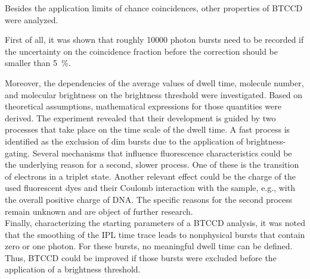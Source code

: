 Besides the application limits of chance coincidences, other properties of \gls{BTCCD} were analyzed. 

First of all, it was shown that roughly \num{10000} photon bursts need to be recorded if the uncertainty on the coincidence fraction before the correction should be smaller than \SI{5}{\percent}. 

Moreover, the dependencies of the average values of dwell time, molecule number, and molecular brightness on the brightness threshold were investigated. Based on theoretical assumptions, mathematical expressions for those quantities were derived. The experiment revealed that their development is guided by two processes that take place on the time scale of the dwell time. A fast process is identified as the exclusion of dim bursts due to the application of brightness-gating. Several mechanisms that influence fluorescence characteristics could be the underlying reason for a second, slower process. One of these is the transition of electrons in a triplet state. Another relevant effect could be the charge of the used fluorescent dyes and their Coulomb interaction with the sample, e.g., with the overall positive charge of DNA. The specific reasons for the second process remain unknown and are object of further research. \\

Finally, characterizing the starting parameters of a \gls{BTCCD} analysis, it was noted that the smoothing of the \gls{IPL} time trace leads to nonphysical bursts that contain zero or one photon. For these bursts, no meaningful dwell time can be defined. Thus, \gls{BTCCD} could be improved if those bursts were excluded before the application of a brightness threshold.